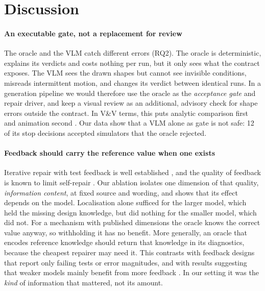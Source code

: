 \section{Discussion}\label{sec:discussion}

\paragraph{An executable gate, not a replacement for review} The oracle and the VLM catch different errors (RQ2). The oracle is deterministic, explains its verdicts and costs nothing per run, but it only sees what the contract exposes. The VLM sees the drawn shapes but cannot see invisible conditions, misreads intermittent motion, and changes its verdict between identical runs. In a generation pipeline we would therefore use the oracle as the \emph{acceptance gate} and repair driver, and keep a visual review as an additional, advisory check for shape errors outside the contract. In V\&V terms, this puts analytic comparison first and animation second \cite{sargent2013vv}. Our data show that a VLM alone as gate is not safe: 12 of its stop decisions accepted simulators that the oracle rejected.

\paragraph{Feedback should carry the reference value when one exists} Iterative repair with test feedback is well established \cite{chen2023selfdebug,xia2024chatrepair,olausson2024selfrepair}, and the quality of feedback is known to limit self-repair \cite{olausson2024selfrepair}. Our ablation isolates one dimension of that quality, \emph{information content}, at fixed source and wording, and shows that its effect depends on the model. Localisation alone sufficed for the larger model, which held the missing design knowledge, but did nothing for the smaller model, which did not. For a mechanism with published dimensions the oracle knows the correct value anyway, so withholding it has no benefit. More generally, an oracle that encodes reference knowledge should return that knowledge in its diagnostics, because the cheapest repairer may need it. This contrasts with feedback designs that report only failing tests or error magnitudes, and with results suggesting that weaker models mainly benefit from more feedback \cite{han2025convcodeworld,pan2025gfr}. In our setting it was the \emph{kind} of information that mattered, not its amount.

